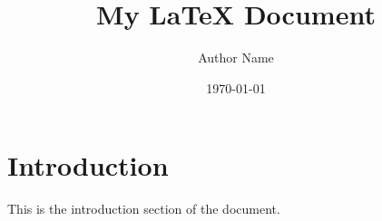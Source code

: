 \documentclass{article}
\title{My LaTeX Document}
\author{Author Name}
\date{\today}
\begin{document}
\maketitle

\section{Introduction}
This is the introduction section of the document.
\end{document}

